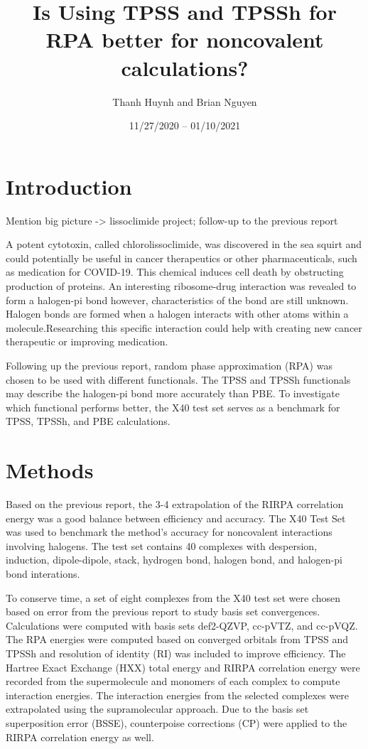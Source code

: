 \documentclass[11pt]{article}
\title{\textbf{Is Using TPSS and TPSSh for RPA better for noncovalent
    calculations?}}
\author{Thanh Huynh and Brian Nguyen}
\date{11/27/2020 -- 01/10/2021 }
\newcommand{\brian}[1]{{\color{orange} #1}}
\begin{document}
\maketitle

\section{Introduction}

\brian{Mention big picture -> lissoclimide project; follow-up to the
  previous report}

A potent cytotoxin, called chlorolissoclimide, was discovered
in the sea squirt and could potentially be useful in cancer therapeutics
or other pharmaceuticals, such as medication for COVID-19. This chemical
induces cell death by obstructing production of proteins. An interesting
ribosome-drug interaction was revealed to form a halogen-pi bond however,
characteristics of the bond are still unknown. Halogen bonds are formed
when a halogen interacts with other atoms within a molecule.Researching
this specific interaction could help with creating new cancer therapeutic
or improving medication.

Following up the previous report, random phase approximation (RPA) was
chosen to be used with different functionals. The TPSS and TPSSh
functionals may describe the halogen-pi bond more accurately than PBE.
To investigate which functional performs better, the X40 test set serves
as a benchmark for TPSS, TPSSh, and PBE calculations.  


\section{Methods}

Based on the previous report, the 3-4 extrapolation of the RIRPA
correlation energy was a good balance between efficiency and accuracy.
The X40 Test Set was used to benchmark the method's accuracy for 
noncovalent interactions involving halogens. The test set contains 40
complexes with despersion, induction, dipole-dipole, stack, hydrogen
bond, halogen bond, and halogen-pi bond interations.

To conserve time, a set of eight complexes from the X40 test set were
chosen based on error from the previous report to study basis set
convergences. Calculations were computed with basis sets def2-QZVP,
cc-pVTZ, and cc-pVQZ. The RPA energies were computed based on converged
orbitals from TPSS and TPSSh and resolution of identity (RI) was included
to improve efficiency. The Hartree Exact Exchange (HXX) total energy and
RIRPA correlation energy were recorded from the supermolecule and
monomers of each complex to compute interaction energies. The interaction
energies from the selected complexes were extrapolated using the
supramolecular approach. Due to the basis set superposition error (BSSE),
counterpoise corrections (CP) were applied to the RIRPA correlation
energy as well.
\end{document}
